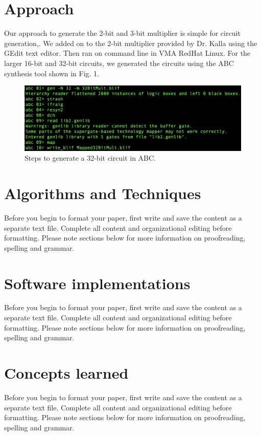 \documentclass[conference]{IEEEtran}
\begin{document}
\section{Approach}
Our approach to generate the 2-bit and 3-bit multiplier is simple for circuit generation,. We added on to the 2-bit multiplier 
provided by Dr. Kalla using the GEdit text editor. Then ran on command line in VMA RedHat Linux. For the larger 16-bit and 32-bit 
circuits, we generated the circuits using the ABC synthesis tool shown in Fig. 1. 
\begin{figure}[ht]
    \centering
    \includegraphics[scale = 0.34]{32bit_abc.png}
    \caption{Steps to generate a 32-bit circuit in ABC.}
    \label{fig}
\end{figure}

\section{Algorithms and Techniques}
Before you begin to format your paper, first write and save the content as a 
separate text file. Complete all content and organizational editing before 
formatting. Please note sections  below for more information on 
proofreading, spelling and grammar.

\section{Software implementations}
Before you begin to format your paper, first write and save the content as a 
separate text file. Complete all content and organizational editing before 
formatting. Please note sections  below for more information on 
proofreading, spelling and grammar.

\section{Concepts learned}
Before you begin to format your paper, first write and save the content as a 
separate text file. Complete all content and organizational editing before 
formatting. Please note sections  below for more information on 
proofreading, spelling and grammar.
\end{document}
